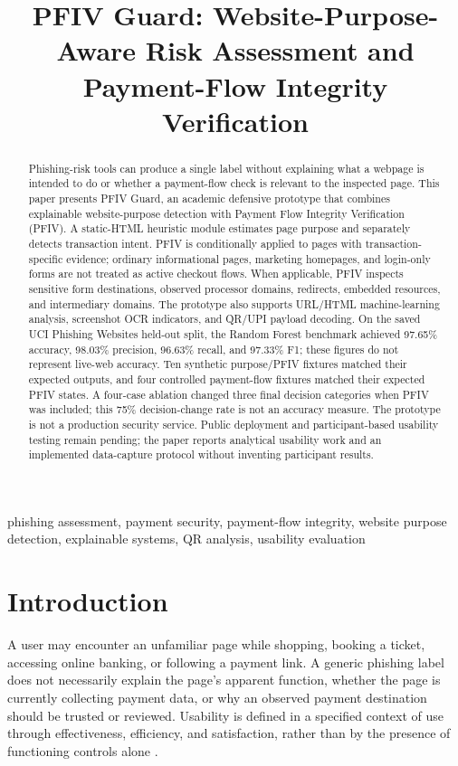 \documentclass[conference]{IEEEtran}
\title{PFIV Guard: Website-Purpose-Aware Risk Assessment and Payment-Flow Integrity Verification}
\author{
\IEEEauthorblockN{Pranav Dwivedi, Aman Yadav, and Shourya Goyal}
\IEEEauthorblockA{School of Computer Science and Engineering (CSE), Business Systems\\
Vellore Institute of Technology, Vellore, India}
}
\begin{document}
\maketitle

\begin{abstract}
Phishing-risk tools can produce a single label without explaining what a webpage is intended to do or whether a payment-flow check is relevant to the inspected page. This paper presents PFIV Guard, an academic defensive prototype that combines explainable website-purpose detection with Payment Flow Integrity Verification (PFIV). A static-HTML heuristic module estimates page purpose and separately detects transaction intent. PFIV is conditionally applied to pages with transaction-specific evidence; ordinary informational pages, marketing homepages, and login-only forms are not treated as active checkout flows. When applicable, PFIV inspects sensitive form destinations, observed processor domains, redirects, embedded resources, and intermediary domains. The prototype also supports URL/HTML machine-learning analysis, screenshot OCR indicators, and QR/UPI payload decoding. On the saved UCI Phishing Websites held-out split, the Random Forest benchmark achieved 97.65\% accuracy, 98.03\% precision, 96.63\% recall, and 97.33\% F1; these figures do not represent live-web accuracy. Ten synthetic purpose/PFIV fixtures matched their expected outputs, and four controlled payment-flow fixtures matched their expected PFIV states. A four-case ablation changed three final decision categories when PFIV was included; this 75\% decision-change rate is not an accuracy measure. The prototype is not a production security service. Public deployment and participant-based usability testing remain pending; the paper reports analytical usability work and an implemented data-capture protocol without inventing participant results.
\end{abstract}

\begin{IEEEkeywords}
phishing assessment, payment security, payment-flow integrity, website purpose detection, explainable systems, QR analysis, usability evaluation
\end{IEEEkeywords}

\section{Introduction}
A user may encounter an unfamiliar page while shopping, booking a ticket, accessing online banking, or following a payment link. A generic phishing label does not necessarily explain the page's apparent function, whether the page is currently collecting payment data, or why an observed payment destination should be trusted or reviewed. Usability is defined in a specified context of use through effectiveness, efficiency, and satisfaction, rather than by the presence of functioning controls alone \cite{iso9241}.
\end{document}

